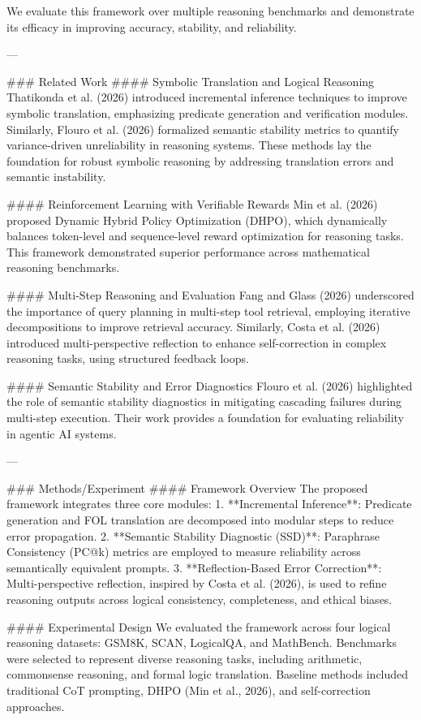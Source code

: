 We evaluate this framework over multiple reasoning benchmarks and demonstrate its efficacy in improving accuracy, stability, and reliability.

---

### Related Work  
#### Symbolic Translation and Logical Reasoning  
Thatikonda et al. (2026) introduced incremental inference techniques to improve symbolic translation, emphasizing predicate generation and verification modules. Similarly, Flouro et al. (2026) formalized semantic stability metrics to quantify variance-driven unreliability in reasoning systems. These methods lay the foundation for robust symbolic reasoning by addressing translation errors and semantic instability.

#### Reinforcement Learning with Verifiable Rewards  
Min et al. (2026) proposed Dynamic Hybrid Policy Optimization (DHPO), which dynamically balances token-level and sequence-level reward optimization for reasoning tasks. This framework demonstrated superior performance across mathematical reasoning benchmarks.

#### Multi-Step Reasoning and Evaluation  
Fang and Glass (2026) underscored the importance of query planning in multi-step tool retrieval, employing iterative decompositions to improve retrieval accuracy. Similarly, Costa et al. (2026) introduced multi-perspective reflection to enhance self-correction in complex reasoning tasks, using structured feedback loops.

#### Semantic Stability and Error Diagnostics  
Flouro et al. (2026) highlighted the role of semantic stability diagnostics in mitigating cascading failures during multi-step execution. Their work provides a foundation for evaluating reliability in agentic AI systems.

---

### Methods/Experiment  
#### Framework Overview  
The proposed framework integrates three core modules:  
1. **Incremental Inference**: Predicate generation and FOL translation are decomposed into modular steps to reduce error propagation.  
2. **Semantic Stability Diagnostic (SSD)**: Paraphrase Consistency (PC@k) metrics are employed to measure reliability across semantically equivalent prompts.  
3. **Reflection-Based Error Correction**: Multi-perspective reflection, inspired by Costa et al. (2026), is used to refine reasoning outputs across logical consistency, completeness, and ethical biases.

#### Experimental Design  
We evaluated the framework across four logical reasoning datasets: GSM8K, SCAN, LogicalQA, and MathBench. Benchmarks were selected to represent diverse reasoning tasks, including arithmetic, commonsense reasoning, and formal logic translation. Baseline methods included traditional CoT prompting, DHPO (Min et al., 2026), and self-correction approaches.

